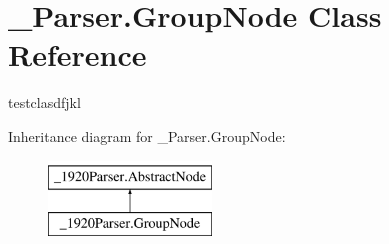 \hypertarget{class__1920_parser_1_1_group_node}{}\section{\+\_\+Parser.\+Group\+Node Class Reference}
\label{class__1920_parser_1_1_group_node}


testclasdfjkl  


Inheritance diagram for \+\_\+Parser.\+Group\+Node\+:\begin{figure}[H]
\begin{center}
\leavevmode
\includegraphics[height=2.000000cm]{class__1920_parser_1_1_group_node}
\end{center}
\end{figure}
